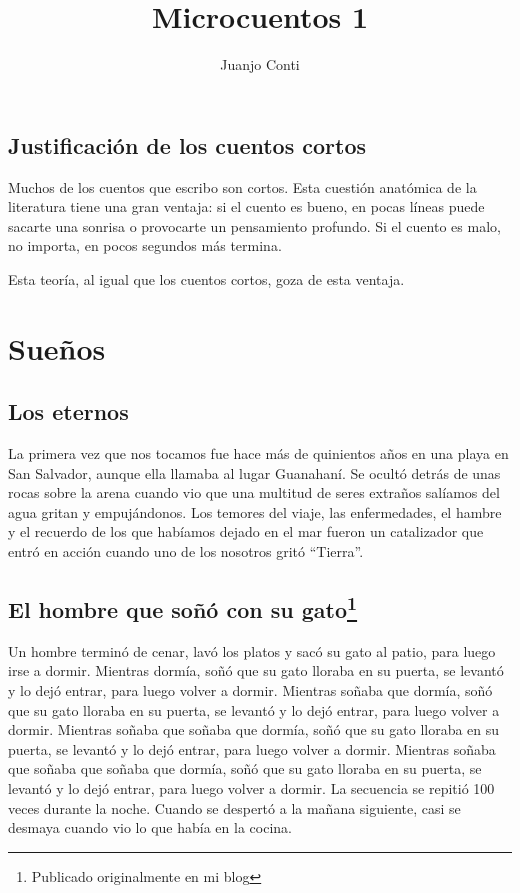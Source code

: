\documentclass[11pt,twoside,openright,a6paper]{book}
\title{Microcuentos 1}
\author{Juanjo Conti}
\date{}
\begin{document}
\pagestyle{plain}

\maketitle

\tableofcontents

\chapter*{Justificación de los cuentos cortos}

Muchos de los cuentos que escribo son cortos. Esta cuestión anatómica de la literatura tiene una gran ventaja: si el cuento es bueno, en pocas líneas puede sacarte una sonrisa o provocarte un pensamiento profundo. Si el cuento es malo, no importa, en pocos segundos más termina.

Esta teoría, al igual que los cuentos cortos, goza de esta ventaja.


\part*{Sueños}

\chapter*{Los eternos}

La primera vez que nos tocamos fue hace más de quinientos años en una playa en San Salvador, aunque ella llamaba al lugar Guanahaní. Se ocultó detrás de unas rocas sobre la arena cuando vio que una multitud de seres extraños salíamos del agua gritan y empujándonos. Los temores del viaje, las enfermedades, el hambre y el recuerdo de los que habíamos dejado en el mar fueron un catalizador que entró en acción cuando uno de los nosotros gritó “Tierra”.

\chapter*{El hombre que soñó con su gato\footnote{Publicado originalmente en mi blog}}

Un hombre terminó de cenar, lavó los platos y sacó su gato al patio, para luego irse a dormir.
Mientras dormía, soñó que su gato lloraba en su puerta, se levantó y lo dejó entrar, para luego volver a dormir.
Mientras soñaba que dormía, soñó que su gato lloraba en su puerta, se levantó y lo dejó entrar, para luego volver a dormir.
Mientras soñaba que soñaba que dormía, soñó que su gato lloraba en su puerta, se levantó y lo dejó entrar, para luego volver a dormir.
Mientras soñaba que soñaba que soñaba que dormía, soñó que su gato lloraba en su puerta, se levantó y lo dejó entrar, para luego volver a dormir.
La secuencia se repitió 100 veces durante la noche.
Cuando se despertó a la mañana siguiente, casi se desmaya cuando vio lo que había en la cocina.
\end{document}
